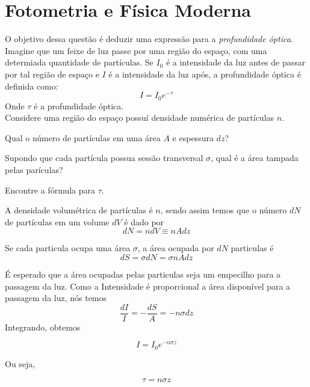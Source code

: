 \documentclass[11pt]{article}
\begin{document}
\newpage

\section{Fotometria e Física Moderna}

\begin{pproblem}
    O objetivo dessa questão é deduzir uma expressão para a \textit{profundidade óptica}. Imagine que um feixe de luz passe por uma região do espaço, com uma determiada quantidade de partículas. Se \(I_0\) é a intensidade da luz antes de passar por tal região de espaço e \(I\) é a intensidade da luz após, a profundidade óptica é definida como:
    \[I = I_0e^{-\tau}\]
    Onde \(\tau\) é a profundidade óptica.
    \\
    Considere uma região do espaço possuí densidade numérica de partículas \(n\).
    \begin{alternativas}
        \item Qual o número de partículas em uma área \(A\) e espessura \(dz\)?
        \item Supondo que cada partícula possua sessão transversal \(\sigma\), qual é a área tampada pelas parículas?
        \item Encontre a fórmula para \(\tau\). 
    \end{alternativas}

\begin{pssolution*}{}{}
    \begin{alternativas}
        \item A densidade volumétrica de partículas é \(n\), sendo assim temos que o número \(dN\) de partículas em um volume \(dV\) é dado por
        \[\boxed{dN = ndV \equiv nAdz}\]

        \item Se cada particula ocupa uma área \(\sigma\), a área ocupada por \(dN\) particulas é
        \[\boxed{dS = \sigma dN = \sigma nAdz}\]

        \item É esperado que a área ocupadas pelas particulas seja um empecilho para a passagem da luz. Como a Intensidade é proporcional a área disponível para a passagem da luz, nós temos
        \[\frac{dI}{I} = -\frac{dS}{A} = -n\sigma dz\]
        Integrando, obtemos

        \[I = I_0 e^{-n\sigma z}\]

        Ou seja, 

        \[\boxed{\tau = n\sigma z}\]
    \end{alternativas}
\end{pssolution*}
\end{pproblem}
\end{document}
